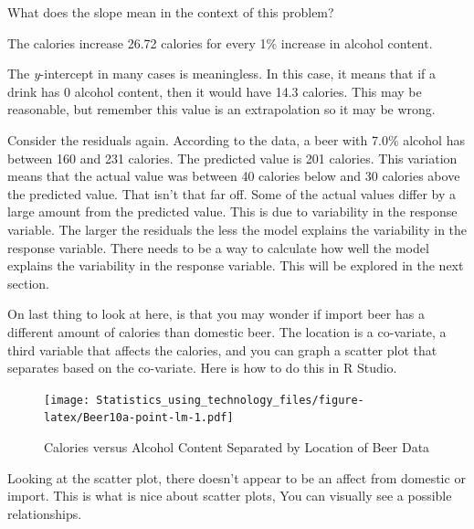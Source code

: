 \documentclass[
]{book}
\newenvironment{Shaded}{\begin{snugshade}}{\end{snugshade}}
\newcommand{\DataTypeTok}[1]{\textcolor[rgb]{0.13,0.29,0.53}{#1}}
\newcommand{\KeywordTok}[1]{\textcolor[rgb]{0.13,0.29,0.53}{\textbf{#1}}}
\newcommand{\NormalTok}[1]{#1}
\newcommand{\OperatorTok}[1]{\textcolor[rgb]{0.81,0.36,0.00}{\textbf{#1}}}
\newcommand{\StringTok}[1]{\textcolor[rgb]{0.31,0.60,0.02}{#1}}
\begin{document}
What does the slope mean in the context of this problem?

The calories increase 26.72 calories for every 1\% increase in alcohol content.

The \emph{y}-intercept in many cases is meaningless. In this case, it means that if a drink has 0 alcohol content, then it would have 14.3 calories. This may be reasonable, but remember this value is an extrapolation so it may be wrong.

Consider the residuals again. According to the data, a beer with 7.0\% alcohol has between 160 and 231 calories. The predicted value is 201 calories. This variation means that the actual value was between 40 calories below and 30 calories above the predicted value. That isn't that far off. Some of the actual values differ by a large amount from the predicted value. This is due to variability in the response variable. The larger the residuals the less the model explains the variability in the response variable. There needs to be a way to calculate how well the model explains the variability in the response variable. This will be explored in the next section.

On last thing to look at here, is that you may wonder if import beer has a different amount of calories than domestic beer. The location is a co-variate, a third variable that affects the calories, and you can graph a scatter plot that separates based on the co-variate. Here is how to do this in R Studio.



\begin{Shaded}
\end{Shaded}

\begin{figure}
\centering
\texttt{[image: Statistics\_using\_technology\_files/figure-latex/Beer10a-point-lm-1.pdf]}
\caption{\label{fig:Beer10a-point-lm}Calories versus Alcohol Content Separated by Location of Beer Data}
\end{figure}

Looking at the scatter plot, there doesn't appear to be an affect from domestic or import. This is what is nice about scatter plots, You can visually see a possible relationships.
\end{document}
